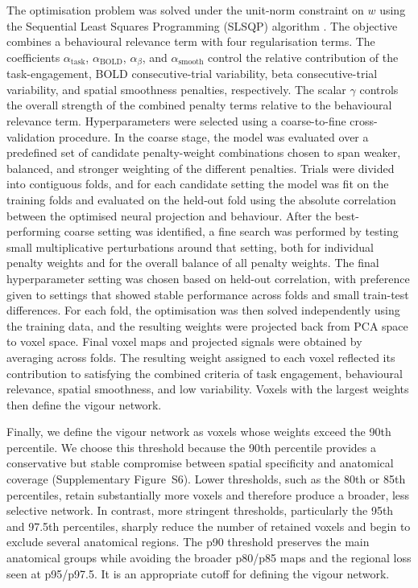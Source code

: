 \documentclass[utf8]{frontiers_suppmat}
\begin{document}
The optimisation problem was solved under the unit-norm constraint on $w$ using the Sequential Least Squares Programming (SLSQP) algorithm \citep{nocedal2006numerical, kraft1988software}. The objective combines a behavioural relevance term with four regularisation terms. The coefficients $\alpha_{\mathrm{task}}$, $\alpha_{\mathrm{BOLD}}$, $\alpha_{\beta}$, and $\alpha_{\mathrm{smooth}}$ control the relative contribution of the task-engagement, BOLD consecutive-trial variability, beta consecutive-trial variability, and spatial smoothness penalties, respectively. The scalar $\gamma$ controls the overall strength of the combined penalty terms relative to the behavioural relevance term. Hyperparameters were selected using a coarse-to-fine cross-validation procedure. In the coarse stage, the model was evaluated over a predefined set of candidate penalty-weight combinations chosen to span weaker, balanced, and stronger weighting of the different penalties. Trials were divided into contiguous folds, and for each candidate setting the model was fit on the training folds and evaluated on the held-out fold using the absolute correlation between the optimised neural projection and behaviour. After the best-performing coarse setting was identified, a fine search was performed by testing small multiplicative perturbations around that setting, both for individual penalty weights and for the overall balance of all penalty weights. The final hyperparameter setting was chosen based on held-out correlation, with preference given to settings that showed stable performance across folds and small train-test differences. For each fold, the optimisation was then solved independently using the training data, and the resulting weights were projected back from PCA space to voxel space. Final voxel maps and projected signals were obtained by averaging across folds. The resulting weight assigned to each voxel reflected its contribution to satisfying the combined criteria of task engagement, behavioural relevance, spatial smoothness, and low variability. Voxels with the largest weights then define the vigour network.

Finally, we define the vigour network as voxels whose weights exceed the 90th percentile. We choose this threshold because the 90th percentile provides a conservative but stable compromise between spatial specificity and anatomical coverage (Supplementary Figure~S6). Lower thresholds, such as the 80th or 85th percentiles, retain substantially more voxels and therefore produce a broader, less selective network. In contrast, more stringent thresholds, particularly the 95th and 97.5th percentiles, sharply reduce the number of retained voxels and begin to exclude several anatomical regions. The p90 threshold preserves the main anatomical groups while avoiding the broader p80/p85 maps and the regional loss seen at p95/p97.5. It is an appropriate cutoff for defining the vigour network.
\end{document}
